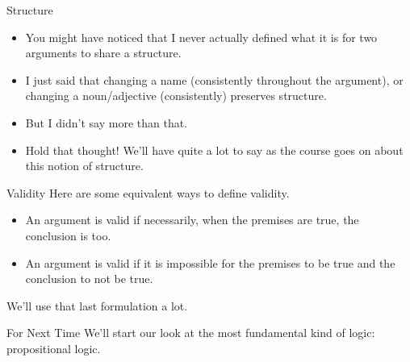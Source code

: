 \documentclass[
  ignorenonframetext,
]{beamer}
\providecommand{\tightlist}{%
  \setlength{\itemsep}{0pt}\setlength{\parskip}{0pt}}
\renewcommand{\,}{\text{, }}
\begin{document}
\begin{frame}{Structure}
\protect\hypertarget{structure-1}{}
\begin{itemize}
\tightlist
\item
  You might have noticed that I never actually defined what it is for
  two arguments to share a structure.
\item
  I just said that changing a name (consistently throughout the
  argument), or changing a noun/adjective (consistently) preserves
  structure.
\item
  But I didn't say more than that.
\item
  Hold that thought! We'll have quite a lot to say as the course goes on
  about this notion of structure.
\end{itemize}
\end{frame}

\begin{frame}{Validity}
\protect\hypertarget{validity}{}
Here are some equivalent ways to define validity.

\begin{itemize}
\tightlist
\item
  An argument is valid if necessarily, when the premises are true, the
  conclusion is too.
\item
  An argument is valid if it is impossible for the premises to be true
  and the conclusion to not be true.
\end{itemize}

We'll use that last formulation a lot.
\end{frame}

\begin{frame}{For Next Time}
\protect\hypertarget{for-next-time}{}
We'll start our look at the most fundamental kind of logic:
propositional logic.
\end{frame}
\end{document}
